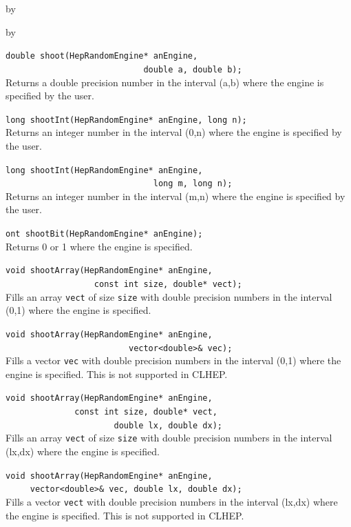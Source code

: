 \documentclass[twoside]{article}
\newcommand{\comp}[1]{\texttt{#1}}%
\newcommand{\entrylabel}[1]{\mbox{\textbf{{#1}}}\hfil}%
\newenvironment{entry}
{\begin{list}{}%
    {\renewcommand{\makelabel}{\entrylabel}%
     \setlength{\labelwidth}{90pt}%
     \setlength{\leftmargin}{\labelwidth}
     \advance\leftmargin by \labelsep%
      }%
    }%
  {\end{list}}
\newcommand{\Entrylabel}[1]%
{\raisebox{0pt}[1ex][0pt]{\makebox[\labelwidth][l]%
    {\parbox[t]{\labelwidth}{\hspace{0pt}\textbf{{#1}}}}}}
\newenvironment{Entry}%
{\renewcommand{\entrylabel}{\Entrylabel}\begin{entry}}%
  {\end{entry}}
\begin{document}
\begin{description}
\begin{Entry}
\begin{Entry}
    \verb+double shoot(HepRandomEngine* anEngine,+\\
    \verb+                            double a, double b);+\\
    Returns a double precision number in the interval (a,b)
    where the engine is specified by the user.
    
    \verb+long shootInt(HepRandomEngine* anEngine, long n);+\\
    Returns an integer number in the interval (0,n)
    where the engine is specified by the user.
    
    \verb+long shootInt(HepRandomEngine* anEngine,+\\
    \verb+                              long m, long n);+\\
    Returns an integer number in the interval (m,n)
    where the engine is specified by the user.
    
    \verb+ont shootBit(HepRandomEngine* anEngine);+\\
    Returns 0 or 1 where the engine is specified.
    
    \verb+void shootArray(HepRandomEngine* anEngine,+\\
    \verb+                  const int size, double* vect);+\\
    Fills an array \comp{vect} of size \comp{size} with double
    precision numbers in the interval (0,1) where the engine is
    specified.

    \verb+void shootArray(HepRandomEngine* anEngine,+\\
    \verb+                         vector<double>& vec);+\\
    Fills a vector \comp{vec} with double
    precision numbers in the interval (0,1) where the engine is
    specified.  This is not supported in CLHEP.
    
   \verb+void shootArray(HepRandomEngine* anEngine,+\\ 
   \verb+              const int size, double* vect,+\\
   \verb+                      double lx, double dx);+\\
   Fills an array \comp{vect} of size \comp{size} with double
   precision numbers in the interval (lx,dx) where the engine is
   specified.

   \verb+void shootArray(HepRandomEngine* anEngine,+\\ 
   \verb+     vector<double>& vec, double lx, double dx);+\\
   Fills a vector \comp{vect} with double
   precision numbers in the interval (lx,dx) where the engine is
   specified.  This is not supported in CLHEP.
   

\end{Entry}
\end{Entry}
\end{description}
\end{document}
